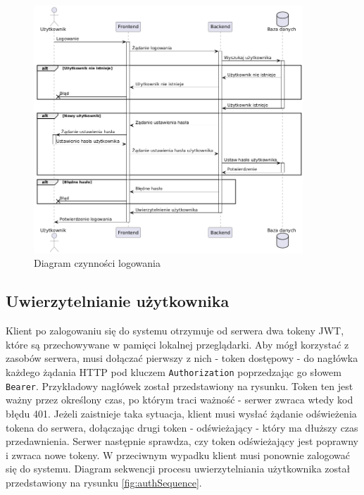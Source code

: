 \begin{figure}[H]
    \centering
    \includegraphics[width=0.9\textwidth]{graf/loginSequence.png}
    \caption{Diagram czynności logowania}
    \label{fig:login}
\end{figure}

\subsection{Uwierzytelnianie użytkownika}

Klient po zalogowaniu się do systemu otrzymuje od serwera dwa tokeny JWT, które są przechowywane w pamięci lokalnej przeglądarki. Aby mógł korzystać z zasobów serwera, musi dołączać pierwszy z nich - token dostępowy - do nagłówka każdego żądania HTTP pod kluczem \texttt{Authorization} poprzedzając go słowem \texttt{Bearer}. Przykładowy nagłówek został przedstawiony na rysunku. Token ten jest ważny przez określony czas, po którym traci ważność - serwer zwraca wtedy kod błędu 401. Jeżeli zaistnieje taka sytuacja, klient musi wysłać żądanie odświeżenia tokena do serwera, dołączając drugi token - odświeżający - który ma dłuższy czas przedawnienia. Serwer następnie sprawdza, czy token odświeżający jest poprawny i zwraca nowe tokeny. W przeciwnym wypadku klient musi ponownie zalogować się do systemu. Diagram sekwencji procesu uwierzytelniania użytkownika został przedstawiony na rysunku \ref{fig:authSequence}.

